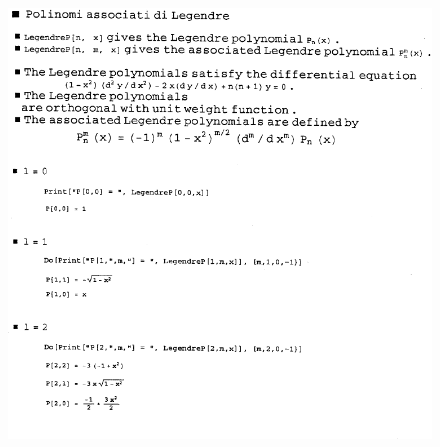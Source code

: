 \documentclass[a4paper,12pt,oneside]{book}
\begin{document}
\begin{figure}[!htbp]
\begin{center}
\includegraphics[width=\textwidth]{immagini/cap_17/fig_17_2.png}\\
\end{center}
\end{figure}
\end{document}
